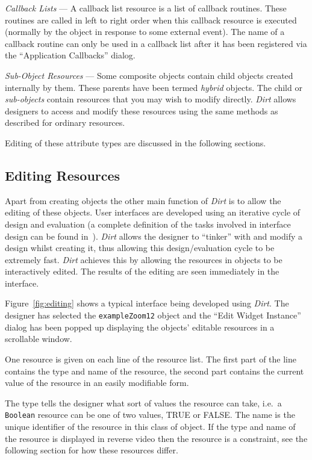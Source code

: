 \begin{description}
\item{\em Callback Lists} ---
A callback list resource is a list of callback routines.  These routines are
called in left to right order when this callback resource is executed (normally
by the object in response to some external event).  The name of a callback
routine can only be used in a callback list after it has been registered via
the ``Application Callbacks'' dialog.

\item{\em Sub-Object Resources} ---
Some composite objects contain child objects created internally by them.  These
parents have been termed {\em hybrid} objects.  The child or {\em sub-objects}
contain resources that you may wish to modify directly.  {\em Dirt} allows
designers to access and modify these resources using the same methods as
described for ordinary resources.
\end{description}
Editing of these attribute types are discussed in the following sections.

\subsection{Editing Resources}
\label{sec:editing-resources}
Apart from creating objects the other main function of {\em Dirt} is to allow
the editing of these objects.  User interfaces are developed using an
iterative cycle of design and evaluation (a complete definition of the tasks
involved in interface design can be found in~\cite{newUITools}).  {\em Dirt}
allows the designer to ``tinker'' with and modify a design whilst 
creating it, thus allowing
this design/evaluation cycle to be extremely fast.  {\em Dirt} achieves
this by allowing the resources in objects to be interactively edited.  The
results of the editing are seen immediately in the interface.

Figure~\ref{fig:editing} shows a typical interface being developed using
{\em Dirt}.  The designer has selected the {\tt exampleZoom12} object and
the ``Edit Widget Instance'' dialog has been popped up displaying the objects'
editable resources in a scrollable window.

One resource is given on each line of the resource list.  The first part
of the line contains the
type and name of the resource, the second part contains the current value of
the resource in an easily modifiable form.

The type tells the designer what sort of values the resource can take, i.e.\ a
{\tt Boolean} resource can be one of two values, TRUE or FALSE.  The name is
the unique identifier of the resource in this class of object.  If the type
and name of the resource is displayed in reverse video then the resource is a
constraint, see the following section for how these resources differ.

